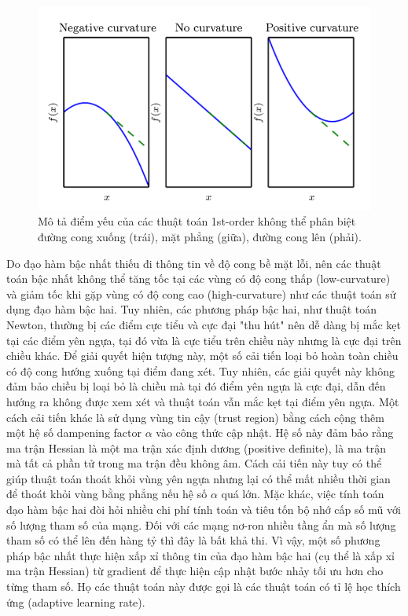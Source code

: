 \begin{figure}[htp]
\centering
\includegraphics[width=120 mm]{images/hessian.png}
\caption{Mô tả điểm yếu của các thuật toán 1st-order không thể phân biệt đường cong xuống (trái), mặt phẳng (giữa), đường cong lên (phải).\parencite{goodfellow2016deeplearning}}
\label{fig:hessian}
\end{figure}

Do đạo hàm bậc nhất thiếu đi thông tin về độ cong bề mặt lỗi, nên các thuật toán bậc nhất không thể tăng tốc tại các vùng có độ cong thấp (low-curvature) và giảm tốc khi gặp vùng có độ cong cao (high-curvature) như các thuật toán sử dụng đạo hàm bậc hai. Tuy nhiên, các phương pháp bậc hai, như thuật toán Newton, thường bị các điểm cực tiểu và cực đại "thu hút" nên dễ dàng bị mắc kẹt tại các điểm yên ngựa, tại đó vừa là cực tiểu trên chiều này nhưng là cực đại trên chiều khác. Để giải quyết hiện tượng này, một số cải tiến loại bỏ hoàn toàn chiều có độ cong hướng xuống tại điểm đang xét. Tuy nhiên, các giải quyết này không đảm bảo chiều bị loại bỏ là chiều mà tại đó điểm yên ngựa là cực đại, dẫn đến hướng ra không được xem xét và thuật toán vẫn mắc kẹt tại điểm yên ngựa. Một cách cải tiến khác là sử dụng vùng tin cậy (trust region) bằng cách cộng thêm một hệ số dampening factor $\alpha$ vào công thức cập nhật. Hệ số này đảm bảo rằng ma trận Hessian là một ma trận xác định dương (positive definite), là ma trận mà tất cả phần tử trong ma trận đều không âm. Cách cải tiến này tuy có thể giúp thuật toán thoát khỏi vùng yên ngựa nhưng lại có thể mất nhiều thời gian để thoát khỏi vùng bằng phẳng nếu hệ số $\alpha$ quá lớn. Mặc khác, việc tính toán đạo hàm bậc hai đòi hỏi nhiều chi phí tính toán và tiêu tốn bộ nhớ cấp số mũ với số lượng tham số của mạng. Đối với các mạng nơ-ron nhiều tầng ẩn mà số lượng tham số có thể lên đến hàng tỷ thì đây là bất khả thi. Vì vậy, một số phương pháp bậc nhất thực hiện xấp xỉ thông tin của đạo hàm bậc hai (cụ thể là xấp xỉ ma trận Hessian) từ gradient để thực hiện cập nhật bước nhảy tối ưu hơn cho từng tham số. Họ các thuật toán này được gọi là các thuật toán có tỉ lệ học thích ứng (adaptive learning rate).

